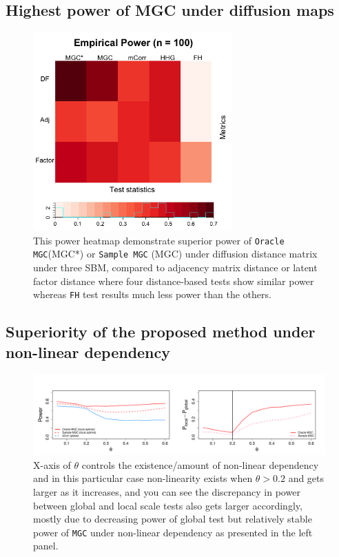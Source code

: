 \documentclass[12pt]{article}
\begin{document}
\subsection*{Highest power of MGC under diffusion maps}

\begin{figure}
	\centering
	\includegraphics[width=3in]{../Figure/ThreeSBM_results.png}
	\caption{This power heatmap demonstrate superior power of \texttt{Oracle MGC}(MGC*) or \texttt{Sample MGC} (MGC) under diffusion distance matrix under three SBM, compared to adjacency matrix distance or latent factor distance where four distance-based tests show similar power whereas \texttt{FH} test results much less power than the others.}
	\label{fig:threeSBM}
\end{figure}


\newpage
\subsection*{Superiority of the proposed method under non-linear dependency}

\begin{figure}[H]
	\centering
	\includegraphics[width=6in]{../Figure/powerplot.pdf}
	\caption{X-axis of $\theta$ controls the existence/amount of non-linear dependency and in this particular case non-linearity exists when $\theta > 0.2$ and gets larger as it increases, and you can see the discrepancy in power between global and local scale tests also gets larger accordingly, mostly due to decreasing power of global test but relatively stable power of \texttt{MGC} under non-linear dependency as presented in the left panel.}
	\label{fig:powerplot}
\end{figure}
\end{document}
